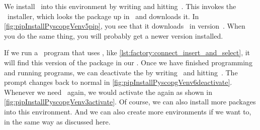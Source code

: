 We install \psycopg\ into this environment by writing  and hitting~\keys{\enter}.
This invokes the \pip\ installer, which looks the package up in \pypi\ and downloads it.
In \cref{fig:pipInstallPyscopgVenv5pip}, you see that it downloads \psycopg\ in version~.
When you do the same thing, you will probably get a newer version installed.

If we run a \python\ program that uses \psycopg, like \cref{lst:factory:connect_insert_and_select}, it will find this version of the package in our .
Once we have finished programming and running programs, we can deactivate the  by writing~ and hitting~\keys{\enter}.
The prompt changes back to normal in \cref{fig:pipInstallPyscopgVenv6deactivate}.
Whenever we need \psycopg\ again, we would activate the  again as shown in \cref{fig:pipInstallPyscopgVenv3activate}.
Of course, we can also install more packages into this environment.
And we can also create more environments if we want to, in the same way as discussed here.%
%
\endhsection%
%
